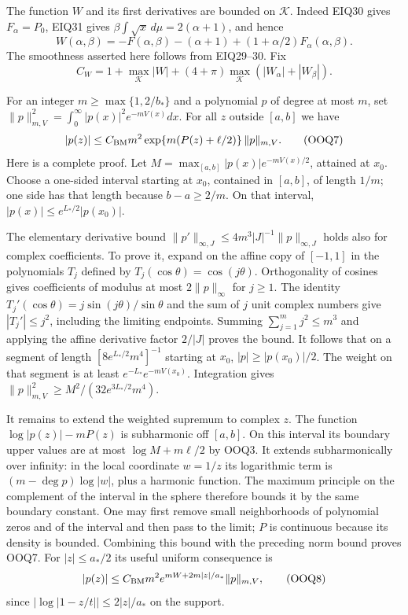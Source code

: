 \documentclass[11pt,a4paper]{article}
\begin{document}
The function $W$ and its first derivatives are bounded on
$\mathcal K$. Indeed EIQ30 gives $F_\alpha=P_0$, EIQ31 gives
$\beta\int\sqrt x\,d\mu=2(\alpha+1)$, and hence
\[
 W(\alpha,\beta)
 =-F(\alpha,\beta)-(\alpha+1)+(1+\alpha/2)F_\alpha(\alpha,\beta).
 \tag{OOQ5}
\]
The smoothness asserted here follows from EIQ29--30. Fix
\[
 C_W=1+\max_{\mathcal K}|W|
                   +(4+\pi)\max_{\mathcal K}(|W_\alpha|+|W_\beta|).
 \tag{OOQ6}
\]

For an integer $m\ge\max\{1,2/b_*\}$ and a polynomial $p$ of
degree at most $m$, set
$\|p\|_{m,V}^2=\int_0^\infty|p(x)|^2e^{-mV(x)}dx$.
For all $z$ outside $[a,b]$ we have
\[
 |p(z)|\le C_{\rm BM}m^2
             \exp\{m(P(z)+\ell/2)\}\,\|p\|_{m,V}.
 \tag{OOQ7}
\]
Here is a complete proof. Let
$M=\max_{[a,b]}|p(x)|e^{-mV(x)/2}$, attained at $x_0$.
Choose a one-sided interval starting at $x_0$, contained in
$[a,b]$, of length $1/m$; one side has that length because
$b-a\ge2/m$. On that interval,
$|p(x)|\le e^{L_*/2}|p(x_0)|$.

The elementary derivative bound
$\|p'\|_{\infty,J}\le4m^3|J|^{-1}\|p\|_{\infty,J}$
holds also for complex coefficients. To prove it, expand on
the affine copy of $[-1,1]$ in the polynomials $T_j$ defined
by $T_j(\cos\theta)=\cos(j\theta)$.
Orthogonality of cosines gives coefficients of modulus at most
$2\|p\|_\infty$ for $j\ge1$. The identity
$T_j'(\cos\theta)=j\sin(j\theta)/\sin\theta$ and the sum of
$j$ unit complex numbers give $|T_j'|\le j^2$, including
the limiting endpoints. Summing $\sum_{j=1}^m j^2\le m^3$
and applying the affine derivative factor $2/|J|$ proves
the bound.
It follows that on a segment of length
$[8e^{L_*/2}m^4]^{-1}$ starting at $x_0$,
$|p|\ge|p(x_0)|/2$. The weight on that segment is at least
$e^{-L_*}e^{-mV(x_0)}$. Integration gives
$\|p\|_{m,V}^2\ge M^2/(32e^{3L_*/2}m^4)$.

It remains to extend the weighted supremum to complex $z$.
The function $\log|p(z)|-mP(z)$ is subharmonic off $[a,b]$.
On this interval its boundary upper values are at most
$\log M+m\ell/2$ by OOQ3. It extends subharmonically over
infinity: in the local coordinate $w=1/z$ its logarithmic
term is $(m-\deg p)\log|w|$, plus a harmonic function.
The maximum principle on the complement of the interval in
the sphere therefore bounds it by the same boundary constant.
One may first remove small neighborhoods of polynomial zeros
and of the interval and then pass to the limit; $P$ is
continuous because its density is bounded. Combining this
bound with the preceding norm bound proves OOQ7.
For $|z|\le a_*/2$ its useful uniform consequence is
\[
 |p(z)|\le C_{\rm BM}m^2
   e^{mW+2m|z|/a_*}\|p\|_{m,V},
 \tag{OOQ8}
\]
since $|\log|1-z/t||\le2|z|/a_*$ on the support.
\end{document}
